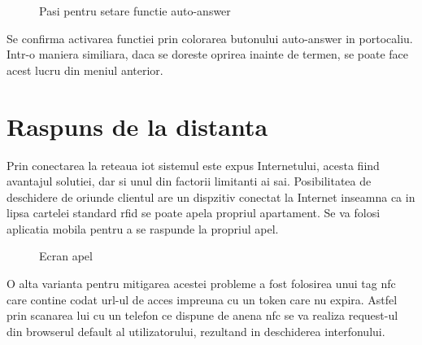 \begin{figure}[H]
\begin{center}
  \hfil
  \caption{Pasi pentru setare functie auto-answer}
  \label{fig:autoanswer}
\end{center}
\end{figure}

Se confirma activarea functiei prin colorarea butonului auto-answer in portocaliu. Intr-o maniera similiara, daca se doreste oprirea inainte de termen, se poate face acest lucru din meniul anterior.

\section{Raspuns de la distanta}

Prin conectarea la reteaua \acrshort{iot} sistemul este expus Internetului, acesta fiind avantajul solutiei, dar si unul din factorii limitanti ai sai. Posibilitatea de deschidere de oriunde clientul are un dispzitiv conectat la Internet inseamna ca in lipsa cartelei standard \acrfull{rfid} se poate apela propriul apartament. Se va folosi aplicatia mobila pentru a se raspunde la propriul apel.

\begin{figure}[H]
\begin{center}
  \hfil
  \caption{Ecran apel}
  \label{fig:ringing}
\end{center}
\end{figure}

O alta varianta pentru mitigarea acestei probleme a fost folosirea unui tag \acrfull{nfc} care contine codat url-ul de acces impreuna cu un token care nu expira. Astfel prin scanarea lui cu un telefon ce dispune de anena \acrshort{nfc} se va realiza request-ul din browserul default al utilizatorului, rezultand in deschiderea interfonului.